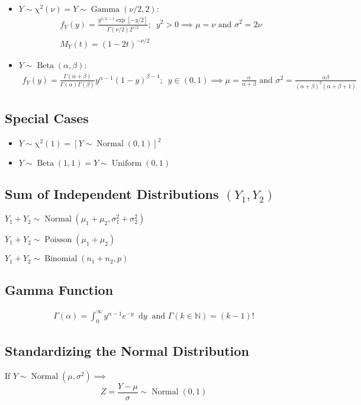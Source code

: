 \documentclass[fontsize=12pt]{article}
\newcommand{\ns}[1]{\mathbb{#1}}
\newcommand{\defn}[1]{\textbf{#1}:}
\newcommand{\binomdist}[3]{#1 \sim \operatorname{Binomial}(#2, #3)}
\newcommand{\unidist}[3]{#1 \sim \operatorname{Uniform}(#2, #3)}
\newcommand{\normdist}[3]{#1 \sim \operatorname{Normal}(#2, #3)}
\newcommand{\gamdist}[3]{#1 \sim \operatorname{Gamma}(#2, #3)}
\newcommand{\chidist}[2]{#1 \sim \operatorname{\chi^2}(#2)}
\newcommand{\betdist}[3]{#1 \sim \operatorname{Beta}(#2, #3)}
\newcommand{\poisson}[2]{#1 \sim \operatorname{Poisson}(#2)}
\newcommand*\diff{\mathop{}\!\mathrm{d}}
\newcommand{\intv}[4]{\int_{#3}^{#4} #1 \diff #2}
\renewcommand{\and}{\text{ and }}
\begin{document}
\begin{itemize}
    \item \defn{$\chidist{Y}{\nu} = \gamdist{Y}{\nu/2}{2}$}
    \begin{gather}
        f_Y(y) = \frac{y^{\nu/2-1}\exp\left[ -y/2 \right]  }{\Gamma(\nu/2)2^{\nu/2}};
        \enspace y^2 > 0
        \implies \mu = \nu \and \sigma^2 = 2\nu\\
        M_Y(t) = (1-2t)^{-\nu/2}
    \end{gather}
    \item \defn{$\betdist{Y}{\alpha}{\beta}$}
    \begin{gather}
        f_Y(y) = \frac{\Gamma(\alpha + \beta)}{\Gamma(\alpha)\Gamma(\beta)}y^{\alpha - 1}(1-y)^{\beta - 1};
        \enspace y\in (0,1)
        \implies \mu = \frac{\alpha}{\alpha + \beta} \and \sigma^2 = \frac{\alpha\beta}{(\alpha+\beta)^2(\alpha + \beta + 1)}
    \end{gather}
\end{itemize}

\subsection{Special Cases}
\begin{itemize}
    \item $\chidist{Y}{1} = \left[ \normdist{Y}{0}{1} \right]^2$
    \item $\betdist{Y}{1}{1} = \unidist{Y}{0}{1}$
\end{itemize}

\subsection{Sum of Independent Distributions $(Y_1, Y_2)$}
\begin{itemize*}
    \item $\normdist{Y_1 + Y_2}{\mu_1 + \mu_2}{\sigma_1^2 + \sigma_2^2}$

    \item $\poisson{Y_1 + Y_2}{\mu_1 + \mu_2}$

    \item $\binomdist{Y_1 + Y_2}{n_1 + n_2}{p}$
\end{itemize*}

\subsection{Gamma Function}
\begin{align*}
    \Gamma(\alpha) = \intv{ y^{\alpha - 1}e^{-y} }{y}{0}{\infty}\
    \and \Gamma(k\in\ns{N}) = (k-1)!
\end{align*}
\subsection{Standardizing the Normal Distribution}
If $\normdist{Y}{\mu}{\sigma^2} \implies $ \[
    \normdist{Z = \frac{Y - \mu}{\sigma}}{0}{1}
\]
\end{document}
